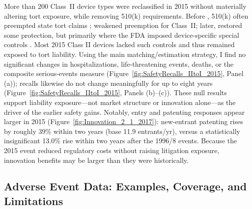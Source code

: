 \documentclass[letterpaper,12pt]{article}
\theoremstyle{definition}
\begin{document}
More than 200 Class~II device types were reclassified in 2015 without materially altering tort exposure, while removing 510(k) requirements.\footnotemark {} Before , 510(k) often preempted state tort claims \citep{flaherty2008defending};  weakened preemption for Class~II; later,  restored some protection, but primarily where the FDA imposed device-specific special controls \citep{Costello:2016}.\footnotemark {} Most 2015 Class II devices lacked such controls and thus remained exposed to tort liability.\footnotemark {} Using the main matching/estimation strategy, I find no significant changes in hospitalizations, life‐threatening events, deaths, or the composite serious‐events measure (Figure~\ref{fig:SafetyRecalls_IItoI_2015}, Panel (a)); recalls likewise do not change meaningfully for up to eight years (Figure~\ref{fig:SafetyRecalls_IItoI_2015}, Panels (b)--(c)). These null results support liability exposure---not market structure or innovation alone---as the driver of the earlier safety gains. Notably, entry and patenting responses appear larger in 2015 (Figure~\ref{fig:Innovation_2_1_2017}): new‐entrant patenting rises by roughly 39\% within two years (base 11.9 entrants/yr), versus a statistically insignificant 13.0\% rise within two years after the 1996/8 events.\footnotemark {} Because the 2015 event reduced regulatory costs without raising litigation exposure, innovation benefits may be larger than they were historically.



\subsection{Adverse Event Data: Examples, Coverage, and Limitations}\label{sec:Adverse_Event_Concerns}
\end{document}
